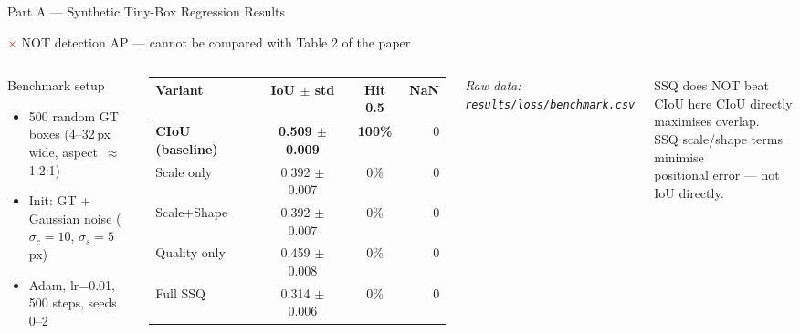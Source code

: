 \documentclass[aspectratio=169, 10pt]{beamer}
\newcommand{\no}{\textcolor{red}{\textbf{$\times$}}}
\newcommand{\best}[1]{\textbf{\textcolor{green!50!black}{#1}}}
\begin{document}
\begin{frame}{Part A — Synthetic Tiny-Box Regression Results}

  \begin{alertblock}{\no\; NOT detection AP — cannot be compared with Table 2 of the paper}
  \end{alertblock}

  \vspace{0.3em}

  \begin{columns}[T]

    \begin{block}{Benchmark setup}
      \begin{itemize}
        \item 500 random GT boxes (4--32\,px wide, aspect~$\approx$1.2:1)
        \item Init: GT + Gaussian noise ($\sigma_c{=}10$, $\sigma_s{=}5$\,px)
        \item Adam, lr=0.01, 500 steps, seeds 0--2
      \end{itemize}
    \end{block}

    \vspace{0.5em}

    \begin{tabular}{lccr}
      \toprule
      Variant & IoU $\pm$ std & Hit 0.5 & NaN \\
      \midrule
      \best{CIoU (baseline)} & \best{0.509 $\pm$ 0.009} & \best{100\%} & 0 \\
      Scale only & 0.392 $\pm$ 0.007 & 0\% & 0 \\
      Scale+Shape & 0.392 $\pm$ 0.007 & 0\% & 0 \\
      Quality only & 0.459 $\pm$ 0.008 & 0\% & 0 \\
      Full SSQ & 0.314 $\pm$ 0.006 & 0\% & 0 \\
      \bottomrule
    \end{tabular}
    \vspace{0.3em}
    \small\textit{Raw data: \texttt{results/loss/benchmark.csv}}

    \begin{alertblock}{SSQ does NOT beat CIoU here}
      CIoU directly maximises overlap.\\
      SSQ scale/shape terms minimise\\
      positional error — not IoU directly.
    \end{alertblock}


\end{columns}
\end{frame}
\end{document}
